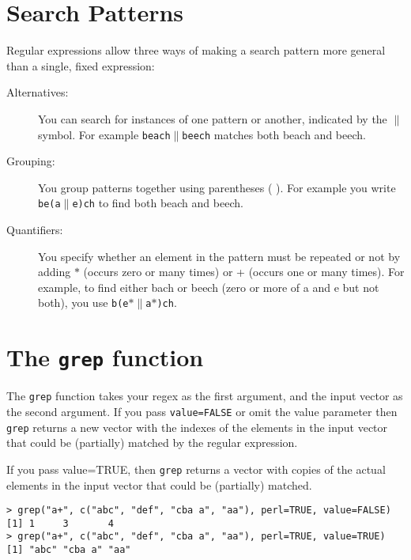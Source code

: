 \documentclass{article}
\begin{document}
\section{Search Patterns}
Regular expressions allow three ways of making a search pattern more general than a single, fixed expression:

\begin{description}
\item[Alternatives:] You can search for instances of one pattern or another, indicated by the $\|$ symbol. For example \texttt{beach}$\|$\texttt{beech} matches both beach and beech.


\item[Grouping:] You group patterns together using parentheses ( ). For example you write \texttt{be(a$\|$e)ch} to find both beach and beech.

\item[Quantifiers:] You specify whether an element in the pattern must be repeated or not by adding $\ast$ (occurs zero or many times) or + (occurs one or many times). For example, to find either bach or beech (zero or more of a and e but not both), you use \texttt{b(e$\ast \|$a$\ast$)ch}.
\end{description}
\section{The \texttt{grep} function }
The \texttt{grep} function takes your regex as the first argument, and the input vector as the second argument. If you pass \texttt{value=FALSE} or omit the value parameter then \texttt{grep}  returns a new vector with the indexes of the elements in the input vector that could be (partially) matched by the regular expression. 

If you pass value=TRUE, then \texttt{grep}  returns a vector with copies of the actual elements in the input vector that could be (partially) matched.
\begin{framed}
\begin{verbatim}
> grep("a+", c("abc", "def", "cba a", "aa"), perl=TRUE, value=FALSE)
[1] 1     3       4
> grep("a+", c("abc", "def", "cba a", "aa"), perl=TRUE, value=TRUE)
[1] "abc" "cba a" "aa"
\end{verbatim}
\end{framed}
\end{document}
